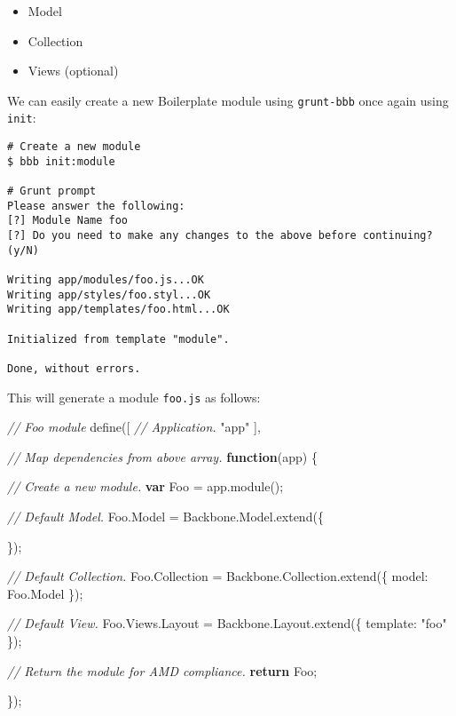 \documentclass[9pt]{book}
\newenvironment{Shaded}{}{}
\newcommand{\KeywordTok}[1]{\textcolor[rgb]{0.00,0.44,0.13}{\textbf{{#1}}}}
\newcommand{\DataTypeTok}[1]{\textcolor[rgb]{0.56,0.13,0.00}{{#1}}}
\newcommand{\StringTok}[1]{\textcolor[rgb]{0.25,0.44,0.63}{{#1}}}
\newcommand{\CommentTok}[1]{\textcolor[rgb]{0.38,0.63,0.69}{\textit{{#1}}}}
\newcommand{\OtherTok}[1]{\textcolor[rgb]{0.00,0.44,0.13}{{#1}}}
\newcommand{\FunctionTok}[1]{\textcolor[rgb]{0.02,0.16,0.49}{{#1}}}
\newcommand{\NormalTok}[1]{{#1}}
\begin{document}
\begin{itemize}
\itemsep1pt\parskip0pt
\item
  Model
\item
  Collection
\item
  Views (optional)
\end{itemize}

We can easily create a new Boilerplate module using \texttt{grunt-bbb}
once again using \texttt{init}:

\begin{verbatim}
# Create a new module
$ bbb init:module

# Grunt prompt
Please answer the following:
[?] Module Name foo
[?] Do you need to make any changes to the above before continuing? (y/N)

Writing app/modules/foo.js...OK
Writing app/styles/foo.styl...OK
Writing app/templates/foo.html...OK

Initialized from template "module".

Done, without errors.
\end{verbatim}

This will generate a module \texttt{foo.js} as follows:

\begin{Shaded}
\begin{Highlighting}[]
\CommentTok{// Foo module}
\FunctionTok{define}\NormalTok{([}
  \CommentTok{// Application.}
  \StringTok{"app"}
\NormalTok{],}

\CommentTok{// Map dependencies from above array.}
\KeywordTok{function}\NormalTok{(app) \{}

  \CommentTok{// Create a new module.}
  \KeywordTok{var} \NormalTok{Foo = }\OtherTok{app}\NormalTok{.}\FunctionTok{module}\NormalTok{();}

  \CommentTok{// Default Model.}
  \OtherTok{Foo}\NormalTok{.}\FunctionTok{Model} \NormalTok{= }\OtherTok{Backbone}\NormalTok{.}\OtherTok{Model}\NormalTok{.}\FunctionTok{extend}\NormalTok{(\{}

  \NormalTok{\});}

  \CommentTok{// Default Collection.}
  \OtherTok{Foo}\NormalTok{.}\FunctionTok{Collection} \NormalTok{= }\OtherTok{Backbone}\NormalTok{.}\OtherTok{Collection}\NormalTok{.}\FunctionTok{extend}\NormalTok{(\{}
    \DataTypeTok{model}\NormalTok{: }\OtherTok{Foo}\NormalTok{.}\FunctionTok{Model}
  \NormalTok{\});}

  \CommentTok{// Default View.}
  \OtherTok{Foo}\NormalTok{.}\OtherTok{Views}\NormalTok{.}\FunctionTok{Layout} \NormalTok{= }\OtherTok{Backbone}\NormalTok{.}\OtherTok{Layout}\NormalTok{.}\FunctionTok{extend}\NormalTok{(\{}
    \DataTypeTok{template}\NormalTok{: }\StringTok{"foo"}
  \NormalTok{\});}

  \CommentTok{// Return the module for AMD compliance.}
  \KeywordTok{return} \NormalTok{Foo;}

\NormalTok{\});}
\end{Highlighting}
\end{Shaded}
\end{document}
